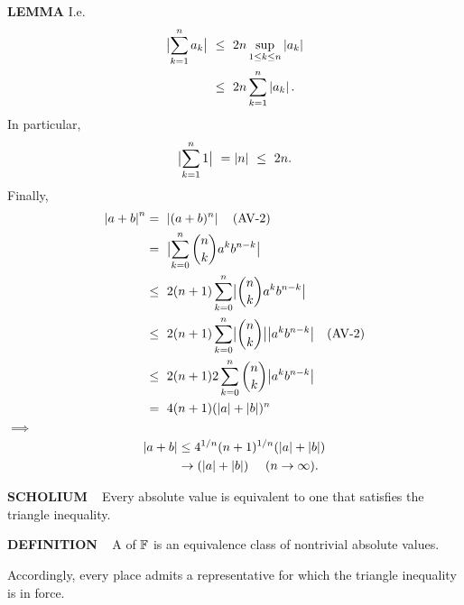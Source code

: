 \begin{x}{\small\bf LEMMA}
\allowdisplaybreaks
I.e.
\allowdisplaybreaks
\[
\begin{aligned}
\bigl|\sum_{k=1}^{n} a_{k} \bigr |  \ 
&\le \ 2n \sup_{1 \le k \le n}\abs{a_k} \\
&\le \ 2n \sum_{k=1}^{n} \abs{a_{k}}. 
\end{aligned}
\]
In particular, 
\[
\bigl|\sum_{k=1}^{n} 1 \bigr | \ = \left\vert n\right\vert \  \le  \ 2n.
\]
Finally, 
\[
\begin{aligned}
\allowdisplaybreaks
\abs{a + b}^n 
&= \  \abs{(a + b)^n} \quad \text{(AV-2)}\\
&=  \ \bigl|\sum_{k=0}^{n} {n \choose k}  a^kb^{n-k}\bigr |\\
&\leq \  2(n+1) \sum_{k=0}^{n} \bigl|{n \choose k}a^kb^{n-k}\bigr | \\
&\leq \  2(n+1) \sum_{k=0}^{n} \bigl|{n \choose k}\bigr | \bigl|a^kb^{n-k}\bigr |    \quad \text{(AV-2)}\\
&\le  \ 2(n+1)2 \sum_{k=0}^{n} {n \choose k} \bigl|a^kb^{n-k}\bigr | \\
&=  \ 4(n+1) (\abs{a} + \abs{b})^n
\end{aligned}
\]
$\implies$\\
\[
\begin{aligned}
\allowdisplaybreaks
\abs{a + b} 
&\le 4^{1/n}(n + 1)^{1/n}(\abs{a} + \abs{b})\\
&\ra (\abs{a} + \abs{b})  \quad \text{ $(n \ra \infty)$}.
\end{aligned}
\]
\end{x}
\vspace{0.1cm}

\begin{x}{\small\bf SCHOLIUM} \ %
Every absolute value is equivalent to one that satisfies the triangle inequality.
\end{x}
\vspace{0.1cm}

\begin{x}{\small\bf DEFINITION} \ %
A 
\un{place}
\index{place} 
of $\mathbb{F}$ is an equivalence class of nontrivial absolute values.
\end{x}
\vspace{0.1cm}

Accordingly, every place admits a representative for which the triangle inequality is in force. \\


